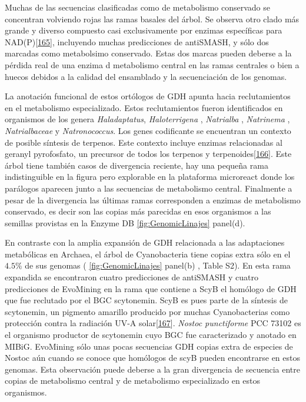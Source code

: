 \documentclass[12pt,twoside]{reedthesis}
\begin{document}
  Muchas de las secuencias clasificadas como de metabolismo conservado se
  concentran volviendo rojas las ramas basales del árbol. Se observa otro
  clado más grande y diverso compuesto casi exclusivamente por enzimas
  específicas para
  NAD(P){[}\protect\hyperlink{ref-ferrer_nadp-glutamate_1996}{165}{]},
  incluyendo muchas predicciones de antiSMASH, y sólo dos marcadas como
  metabolsimo conservado. Estas dos marcas pueden deberse a la pérdida
  real de una enzima d metabolismo central en las ramas centrales o bien a
  huecos debidos a la calidad del ensamblado y la secuenciación de los
  genomas.
  
  La anotación funcional de estos ortólogos de GDH apunta hacia
  reclutamientos en el metabolismo especializado. Estos reclutamientos
  fueron identificados en organismos de los genera \emph{Haladaptatus},
  \emph{Haloterrigena} , \emph{Natrialba} , \emph{Natrinema} ,
  \emph{Natrialbaceae} y \emph{Natronococcus}. Los genes codificante se
  encuentran un contexto de posible síntesis de terpenos. Este contexto
  incluye enzimas relacionadas al geranyl pyrofosfato, un precursor de
  todos los terpenos y
  terpenoides{[}\protect\hyperlink{ref-tholl_terpene_2006}{166}{]}. Este
  árbol tiene también casos de divergencia reciente, hay una pequeña rama
  indistinguible en la figura pero explorable en la plataforma microreact
  donde los parálogos aparecen junto a las secuencias de metabolismo
  central. Finalmente a pesar de la divergencia las últimas ramas
  corresponden a enzimas de metabolismo conservado, es decir son las
  copias más parecidas en esos organismos a las semillas provistas en la
  Enzyme DB \autoref{fig:GenomicLinajes} panel(d).
  
  En contraste con la amplia expansión de GDH relacionada a las
  adaptaciones metabólicas en Archaea, el árbol de Cyanobacteria tiene
  copias extra sólo en el \(4.5\%\) de sus genomas (
  \autoref{fig:GenomicLinajes} panel(b) , Table S2). En esta rama
  expandida se encontraron cuatro predicciones de antiSMASH y cuatro
  predicciones de EvoMining en la rama que contiene a ScyB el homólogo de
  GDH que fue reclutado por el BGC scytonemin. ScyB es pues parte de la
  síntesis de scytonemin, un pigmento amarillo producido por muchas
  Cyanobacterias como protección contra la radiación UV-A
  solar{[}\protect\hyperlink{ref-balskus_genetic_2010}{167}{]}.
  \emph{Nostoc punctiforme} PCC 73102 es el organismo productor de
  scytonemin cuyo BGC fue caracterizado y anotado en MIBiG. EvoMining sólo
  unas pocas secuencias GDH copias extra de especies de Nostoc aún cuando
  se conoce que homólogos de scyB pueden encontrarse en estos genomas.
  Esta observación puede deberse a la gran divergencia de secuencia entre
  copias de metabolismo central y de metabolismo especializado en estos
  organismos.
  
\end{document}
